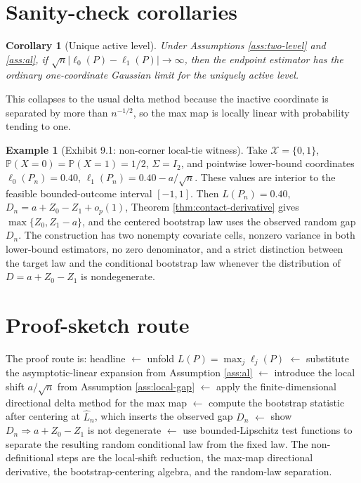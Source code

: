 \documentclass[11pt]{article}
\renewcommand{\Pr}{\mathbb{P}}
\theoremstyle{definition}
\newtheorem{example}{Example}
\theoremstyle{plain}
\newtheorem{corollary}{Corollary}
\theoremstyle{remark}
\begin{document}
\section{Sanity-check corollaries}
\begin{corollary}[Unique active level]\label{cor:unique}
Under Assumptions \ref{ass:two-level} and \ref{ass:al}, if \(\sqrt n|\ell_0(P)-\ell_1(P)|\to\infty\), then the endpoint estimator has the ordinary one-coordinate Gaussian limit for the uniquely active level.
\end{corollary}

This collapses to the usual delta method because the inactive coordinate is separated by more than \(n^{-1/2}\), so the max map is locally linear with probability tending to one.

\begin{example}[Exhibit 9.1: non-corner local-tie witness]\label{ex:witness}
Take \(\mathcal X=\{0,1\}\), \(\Pr(X=0)=\Pr(X=1)=1/2\), \(\Sigma=I_2\), and pointwise lower-bound coordinates \(\ell_0(P_n)=0.40\), \(\ell_1(P_n)=0.40-a/\sqrt n\). These values are interior to the feasible bounded-outcome interval \([-1,1]\). Then \(L(P_n)=0.40\), \(D_n=a+Z_0-Z_1+o_p(1)\), Theorem \ref{thm:contact-derivative} gives \(\max\{Z_0,Z_1-a\}\), and the centered bootstrap law uses the observed random gap \(D_n\). The construction has two nonempty covariate cells, nonzero variance in both lower-bound estimators, no zero denominator, and a strict distinction between the target law and the conditional bootstrap law whenever the distribution of \(D=a+Z_0-Z_1\) is nondegenerate.
\end{example}

\section{Proof-sketch route}
The proof route is: headline \(\leftarrow\) unfold \(L(P)=\max_j\ell_j(P)\) \(\leftarrow\) substitute the asymptotic-linear expansion from Assumption \ref{ass:al} \(\leftarrow\) introduce the local shift \(a/\sqrt n\) from Assumption \ref{ass:local-gap} \(\leftarrow\) apply the finite-dimensional directional delta method for the max map \(\leftarrow\) compute the bootstrap statistic after centering at \(\widehat L_n\), which inserts the observed gap \(D_n\) \(\leftarrow\) show \(D_n\Rightarrow a+Z_0-Z_1\) is not degenerate \(\leftarrow\) use bounded-Lipschitz test functions to separate the resulting random conditional law from the fixed law. The non-definitional steps are the local-shift reduction, the max-map directional derivative, the bootstrap-centering algebra, and the random-law separation.
\end{document}
